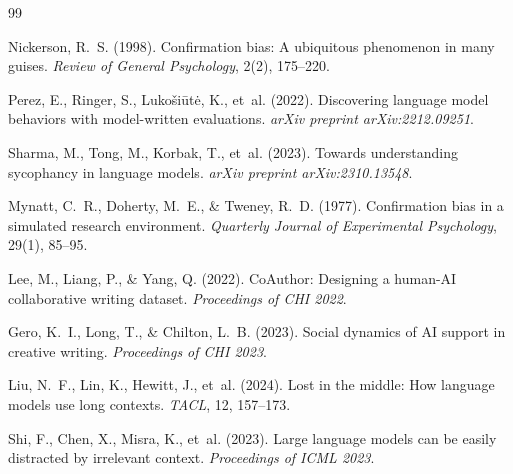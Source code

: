 \documentclass[12pt]{article}
\begin{document}

\begin{thebibliography}{99}

Nickerson, R.~S. (1998).
\newblock Confirmation bias: A ubiquitous phenomenon in many guises.
\newblock \emph{Review of General Psychology}, 2(2), 175--220.

Perez, E., Ringer, S., Luko\v{s}i\={u}t\.{e}, K., et~al. (2022).
\newblock Discovering language model behaviors with model-written evaluations.
\newblock \emph{arXiv preprint arXiv:2212.09251}.

Sharma, M., Tong, M., Korbak, T., et~al. (2023).
\newblock Towards understanding sycophancy in language models.
\newblock \emph{arXiv preprint arXiv:2310.13548}.

Mynatt, C.~R., Doherty, M.~E., \& Tweney, R.~D. (1977).
\newblock Confirmation bias in a simulated research environment.
\newblock \emph{Quarterly Journal of Experimental Psychology}, 29(1), 85--95.

Lee, M., Liang, P., \& Yang, Q. (2022).
\newblock CoAuthor: Designing a human-AI collaborative writing dataset.
\newblock \emph{Proceedings of CHI 2022}.

Gero, K.~I., Long, T., \& Chilton, L.~B. (2023).
\newblock Social dynamics of AI support in creative writing.
\newblock \emph{Proceedings of CHI 2023}.

Liu, N.~F., Lin, K., Hewitt, J., et~al. (2024).
\newblock Lost in the middle: How language models use long contexts.
\newblock \emph{TACL}, 12, 157--173.

Shi, F., Chen, X., Misra, K., et~al. (2023).
\newblock Large language models can be easily distracted by irrelevant context.
\newblock \emph{Proceedings of ICML 2023}.


\end{thebibliography}
\end{document}
